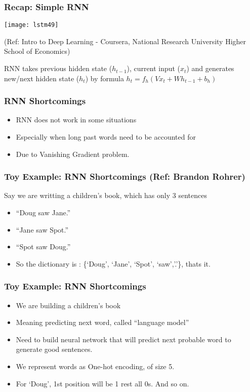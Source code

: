 \begin{frame}[fragile] \frametitle{Recap: Simple RNN}
\begin{center}
\texttt{[image: lstm49]}

\tiny{(Ref: Intro to Deep Learning - Coursera, National Research University Higher School of Economics)}
\end{center}
RNN takes previous hidden state ($h_{t-1}$), current input ($x_t$) and generates new/next hidden state ($h_t$) by formula $h_t = f_h ( Vx_t + Wh_{t-1} + b_h)$
\end{frame}

\begin{frame}[fragile] \frametitle{RNN Shortcomings}
\begin{itemize}
\item RNN does not work in some situations
\item Especially when long past words need to be accounted for
\item Due to Vanishing Gradient problem.
\end{itemize}
\end{frame}

\begin{frame}[fragile] \frametitle{Toy Example: RNN Shortcomings (Ref: Brandon Rohrer)}
Say we are writting a children's book, which has only 3 sentences
\begin{itemize}
\item ``Doug saw Jane.''
\item ``Jane saw Spot.''
\item ``Spot saw Doug.''
\item So the dictionary is : \{`Doug', `Jane', `Spot', `saw','.'\}, thats it.
\end{itemize}
\end{frame}

\begin{frame}[fragile] \frametitle{Toy Example: RNN Shortcomings}
\begin{itemize}
\item We are building a children's book
\item Meaning predicting next word, called ``language model''
\item Need to build neural network that will predict next probable word to generate good sentences.
\item We represent words as One-hot encoding, of size 5.
\item For `Doug', 1st position will be 1 rest all 0s. And so on.
\end{itemize}
\end{frame}

